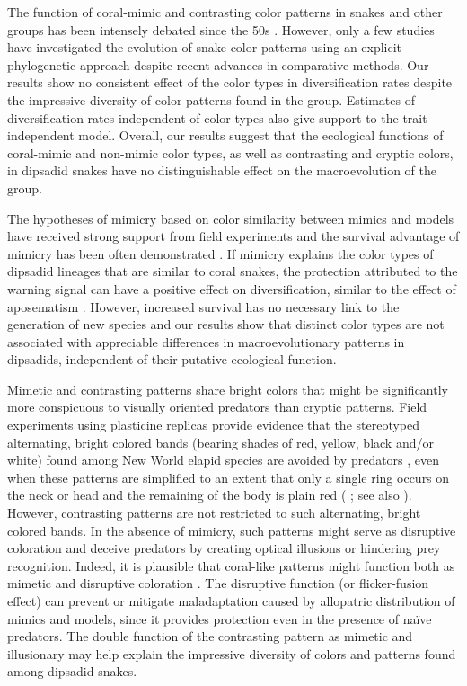 The function of coral-mimic and contrasting color patterns in snakes and other groups has been intensely debated since the 50s \citep{dunn_coral_1954, hecht_coral_1956}. However, only a few studies have investigated the evolution of snake color patterns using an explicit phylogenetic approach \citep[e.g.,][]{pyron_2009, rabosky_coral_2016} despite recent advances in comparative methods. Our results show no consistent effect of the color types in diversification rates despite the impressive diversity of color patterns found in the group. Estimates of diversification rates independent of color types also give support to the trait-independent model. Overall, our results suggest that the ecological functions of coral-mimic and non-mimic color types, as well as contrasting and cryptic colors, in dipsadid snakes have no distinguishable effect on the macroevolution of the group.

The hypotheses of mimicry based on color similarity between mimics and models have received strong support from field experiments and the survival advantage of mimicry has been often demonstrated \citep{smith_1975, brodie_differential_1993, brodie_experimental_1995, hinman_predation_1997, pfennig_2001, buasso_predation_2006}. If mimicry explains the color types of dipsadid lineages that are similar to coral snakes, the protection attributed to the warning signal can have a positive effect on diversification, similar to the effect of aposematism \citep{mallet_evolution_1999, przeczek_2008}. However, increased survival has no necessary link to the generation of new species and our results show that distinct color types are not associated with appreciable differences in macroevolutionary patterns in dipsadids, independent of their putative ecological function.

Mimetic and contrasting patterns share bright colors that might be significantly more conspicuous to visually oriented predators than cryptic patterns. Field experiments using plasticine replicas provide evidence that the stereotyped alternating, bright colored bands (bearing shades of red, yellow, black and/or white) found among New World elapid species are avoided by predators \citep{brodie_differential_1993, brodie_experimental_1995, hinman_predation_1997, pfennig_2001, buasso_predation_2006}, even when these patterns are simplified to an extent that only a single ring occurs on the neck or head and the remaining of the body is plain red ( \citealp{brodie_differential_1993}; see also \citealp{hinman_predation_1997}). However, contrasting patterns are not restricted to such alternating, bright colored bands. In the absence of mimicry, such patterns might serve as disruptive coloration and deceive predators by creating optical illusions or hindering prey recognition. Indeed, it is plausible that coral-like patterns might function both as mimetic and disruptive coloration \citep{dunn_coral_1954, titcomb_2014}. The disruptive function (or flicker-fusion effect) can prevent or mitigate maladaptation caused by allopatric distribution of mimics and models, since it provides protection even in the presence of naïve predators. The double function of the contrasting pattern as mimetic and illusionary may help explain the impressive diversity of colors and patterns found among dipsadid snakes.

